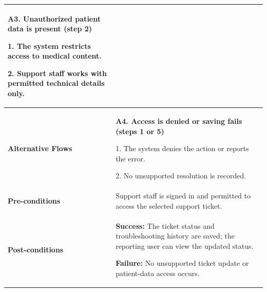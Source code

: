 \begin{longtable}{|p{}|p{}|}
\textbf{A3. Unauthorized patient data is present (step 2)}\par
1. The system restricts access to medical content.\par
2. Support staff works with permitted technical details only.
\\ \hline
\textbf{Alternative Flows} &
\textbf{A4. Access is denied or saving fails (steps 1 or 5)}\par
1. The system denies the action or reports the error.\par
2. No unsupported resolution is recorded.
\\ \hline
\textbf{Pre-conditions} &
Support staff is signed in and permitted to access the selected support ticket.
\\ \hline
\textbf{Post-conditions} &
\textbf{Success:} The ticket status and troubleshooting history are saved; the reporting user can view the updated status.\par
\textbf{Failure:} No unsupported ticket update or patient-data access occurs.
\\ \hline
\end{longtable}
\clearpage

